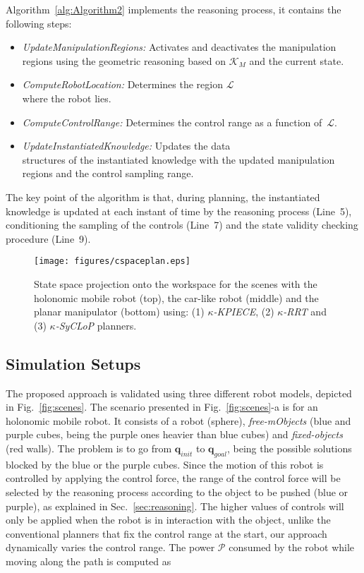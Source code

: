 \documentclass[twocolumn]{svjour3}          %
\begin{document}
Algorithm~\ref{alg:Algorithm2} implements the reasoning process, it contains the following steps:
\begin{itemize}
 \item \textit{UpdateManipulationRegions:} Activates and deactivates the manipulation regions 
 using the geometric reasoning based on $\mathcal{K}_M$ and the current state. 
 \item \textit{ComputeRobotLocation:} Determines the region $\mathcal{L}$ \\where the robot lies.
 \item \textit{ComputeControlRange:} Determines the control range as a function of~$\mathcal{L}$.
 \item \textit{UpdateInstantiatedKnowledge:} Updates the data \\structures of the instantiated knowledge with the updated manipulation regions and the control sampling range.
\end{itemize}
The key point of the algorithm is that, during planning,  the instantiated knowledge is updated at each instant of time by the reasoning process (Line~5), conditioning the sampling of the 
controls (Line~7) and the state validity checking procedure (Line~9).
\begin{figure}[h]
\begin{center}
   \texttt{[image: figures/cspaceplan.eps]}
   \caption{State space projection onto the workspace for the scenes with the holonomic mobile robot (top), the car-like robot (middle) and the planar manipulator (bottom) using: (1) \textit{$\kappa$-KPIECE}, (2) 
\textit{$\kappa$-RRT} and (3) \textit{$\kappa$-SyCLoP} planners.}\label{fig:cspace}
\end{center}
\end{figure}
\subsection{Simulation Setups}
The proposed approach is validated using three different robot models, depicted in Fig.~\ref{fig:scenes}. The scenario presented in Fig.~\ref{fig:scenes}-a is for an holonomic mobile robot. It consists of a robot (sphere), \textit{free-mObjects} (blue and purple cubes, being the purple ones heavier than blue cubes) and \textit{fixed-objects} (red walls). The problem is to go from $\mathbf{q}_{init}$ to $\mathbf{q}_{goal}$, being the possible solutions blocked by the blue or the purple cubes. Since the motion of this robot is controlled by applying the control force, the range of the control force will be selected by the reasoning process according to the object to be pushed (blue or purple), as explained in Sec.~\ref{sec:reasoning}. The higher values of controls will only be applied when the robot is in interaction with the object, unlike the conventional planners that fix the control range at the start, our approach dynamically varies the control range. The power $\mathcal{P}$ consumed by the robot while moving along the path is computed as
\end{document}

